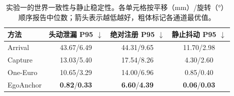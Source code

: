 \begin{table}[t]
\centering
\caption{实验一的世界一致性与静止稳定性。各单元格按平移（mm）/旋转（°）顺序报告中位数；箭头表示越低越好，粗体标记各通道最优值。}
\label{tab:exp1-static}
\setlength{\tabcolsep}{3.0pt}
\renewcommand{\arraystretch}{1.10}
\begin{tabular}{@{}lccc@{}}
\toprule
方法 &
\shortstack{头动泄漏\\P95 $\downarrow$} &
\shortstack{绝对注册\\P95 $\downarrow$} &
\shortstack{静止抖动\\P95 $\downarrow$} \\
\midrule
Arrival   & 43.67/6.49 & 44.31/9.65 & 11.70/2.98 \\
Capture   & 13.03/5.40 & 17.54/8.26 & 4.30/2.60 \\
One-Euro  & 10.65/3.29 & 14.00/6.96 & 0.85/0.40 \\
EgoAnchor & \textbf{0.82}/\textbf{0.33} & \textbf{6.60}/\textbf{4.39} & \textbf{0.06}/\textbf{0.03} \\
\bottomrule
\end{tabular}
\end{table}

